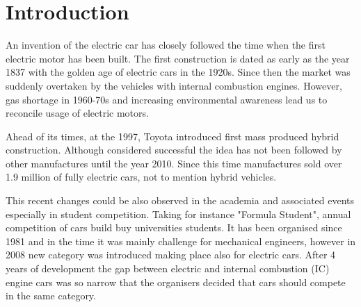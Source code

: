 





\chapter{Introduction}

An invention of the electric car has closely followed the time when the first electric motor has been built. The first construction is dated as early as the year 1837 with the golden age of electric cars in the 1920s. Since then the market was suddenly overtaken by the vehicles with internal combustion engines. However, gas shortage in 1960-70s and increasing environmental awareness lead us to reconcile usage of electric motors.

Ahead of its times, at the 1997, Toyota introduced first mass produced hybrid construction. Although considered successful the idea has not been followed by other manufactures until the year 2010. Since this time manufactures sold over 1.9 million of fully electric cars, not to mention hybrid vehicles. 

This recent changes could be also observed in the academia and associated events especially in student competition. Taking for instance "Formula Student", annual competition of cars build buy universities students. It has been organised since 1981 and in the time it was mainly challenge for mechanical engineers, however in 2008 new category was introduced making place also for electric cars.
After 4 years of development the gap between electric and internal combustion (IC) engine cars was so narrow that the organisers decided that cars should compete in the same category.

